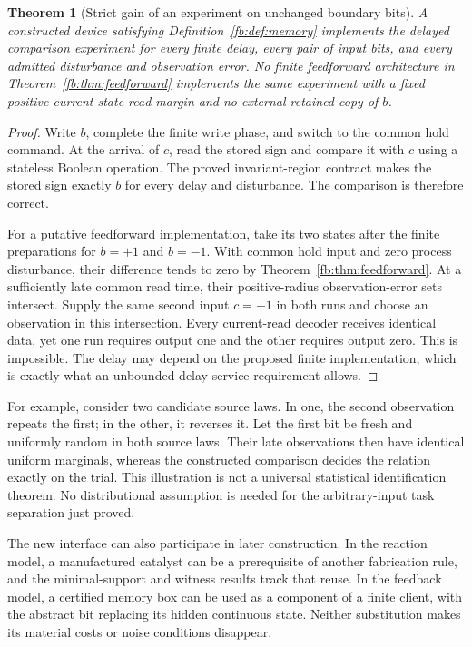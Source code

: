 \documentclass[11pt]{article}
\newtheorem{theorem}{Theorem}[section]
\theoremstyle{definition}
\theoremstyle{remark}
\begin{document}
\begin{theorem}[Strict gain of an experiment on unchanged boundary bits]
\label{thm:experiment-gain}
A constructed device satisfying Definition~\ref{fb:def:memory} implements
the delayed comparison experiment for every finite delay, every pair of
input bits, and every admitted disturbance and observation error. No
finite feedforward architecture in Theorem~\ref{fb:thm:feedforward}
implements the same experiment with a fixed positive current-state read
margin and no external retained copy of $b$.
\end{theorem}
\begin{proof}
Write $b$, complete the finite write phase, and switch to the common hold
command. At the arrival of $c$, read the stored sign and compare it with
$c$ using a stateless Boolean operation. The proved invariant-region
contract makes the stored sign exactly $b$ for every delay and disturbance.
The comparison is therefore correct.

For a putative feedforward implementation, take its two states after the
finite preparations for $b=+1$ and $b=-1$. With common hold input and zero
process disturbance, their difference tends to zero by
Theorem~\ref{fb:thm:feedforward}. At a sufficiently late common read time,
their positive-radius observation-error sets intersect. Supply the same
second input $c=+1$ in both runs and choose an observation in this
intersection. Every current-read decoder receives identical data, yet
one run requires output one and the other requires output zero. This is
impossible. The delay may depend on the proposed finite implementation,
which is exactly what an unbounded-delay service requirement allows.
\end{proof}

For example, consider two candidate source laws. In one, the second
observation repeats the first; in the other, it reverses it. Let the first bit be fresh and uniformly random in both source laws.
Their late observations then have identical uniform marginals, whereas
the constructed comparison decides the relation exactly on the trial.
This illustration is not a universal statistical identification theorem.
No distributional assumption is needed for the arbitrary-input task
separation just proved.

The new interface can also participate in later construction. In the
reaction model, a manufactured catalyst can be a prerequisite of another
fabrication rule, and the minimal-support and witness results track that
reuse. In the feedback model, a certified memory box can be used as a
component of a finite client, with the abstract bit replacing its hidden
continuous state. Neither substitution makes its material costs or noise
conditions disappear.
\end{document}
